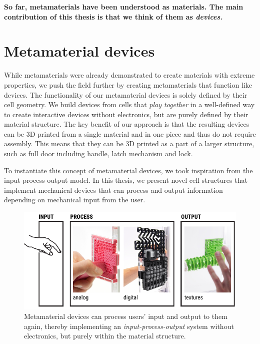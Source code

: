 \singlespacing
\begin{siderule}
\large\textbf{So far, metamaterials have been understood as \mbox{materials.} The main contribution of this thesis is that we think of them as \textit{devices.}}
\end{siderule}
\onehalfspacing



\section{Metamaterial devices}

While metamaterials were already demonstrated to create materials with extreme properties, we push the field further by creating metamaterials that function like devices. The functionality of our metamaterial devices is solely defined by their cell geometry. We build devices from cells that \textit{play together} in a well-defined way to create interactive devices without electronics, but are purely defined by their material structure. The key benefit of our approach is that the resulting devices can be 3D printed from a single material and in one piece and thus do not require assembly. This means that they can be 3D printed as a part of a larger structure, such as full door including handle, latch mechanism and lock.


To instantiate this concept of metamaterial devices, we took inspiration from the input-process-output model. In this thesis, we present novel cell structures that implement mechanical devices that can process and output information depending on mechanical input from the user. 

\begin{figure} [h] %
    \includegraphics[width=\textwidth]{chapters/introduction-FIG/1-input-process-output.pdf}
    \caption[Short figure name.]{Metamaterial devices can process users' input and output to them again, thereby implementing an \textit{input-process-output} system without electronics, but purely within the material structure.
    \label{fig:1-overview-input-process-output-model}}
\end{figure}

